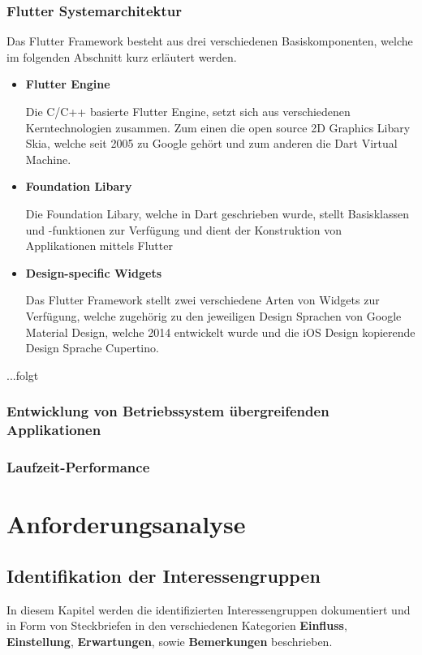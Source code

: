 \documentclass{scrreprt}
\begin{document}
\subsection{Flutter Systemarchitektur} 
Das Flutter Framework besteht aus drei verschiedenen Basiskomponenten, welche im folgenden Abschnitt kurz erläutert werden.
\begin{itemize}
\item{\textbf{Flutter Engine}}

Die C/C++ basierte Flutter Engine, setzt sich aus verschiedenen Kerntechnologien zusammen. Zum einen die open source 2D Graphics Libary Skia\cite{Skia1}, welche seit 2005 zu Google gehört und zum anderen die Dart Virtual Machine.
\item{\textbf{Foundation Libary}}

Die Foundation Libary, welche in Dart geschrieben wurde, stellt Basisklassen und -funktionen zur Verfügung und dient der Konstruktion von Applikationen mittels Flutter
\item{\textbf{Design-specific Widgets}}

Das Flutter Framework stellt zwei verschiedene Arten von Widgets zur Verfügung, welche zugehörig zu den jeweiligen Design Sprachen von Google Material Design\cite{Mat1}, welche 2014 entwickelt wurde und die iOS Design kopierende Design Sprache Cupertino\cite{Cup1}.
\end{itemize}

		...folgt

\subsection{Entwicklung von Betriebssystem übergreifenden Applikationen}

\subsection{Laufzeit-Performance}


\chapter{Anforderungsanalyse}

\section{Identifikation der Interessengruppen}
\par In diesem Kapitel werden die identifizierten Interessengruppen dokumentiert und in Form von Steckbriefen in den verschiedenen Kategorien \textbf{Einfluss}, \textbf{Einstellung}, \textbf{Erwartungen}, sowie \textbf{Bemerkungen}  beschrieben.  
\end{document}
